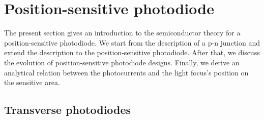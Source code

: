 \section{Position-sensitive photodiode}

The present section gives an introduction to the semiconductor theory for a position-sensitive photodiode.
We start from the description of a p-n junction and extend the description to the position-sensitive photodiode.
After that, we discuss the evolution of position-sensitive photodiode designs.
Finally, we derive an analytical relation between the photocurrents and the light focus's position on the sensitive area.

\subsection{Transverse photodiodes}

